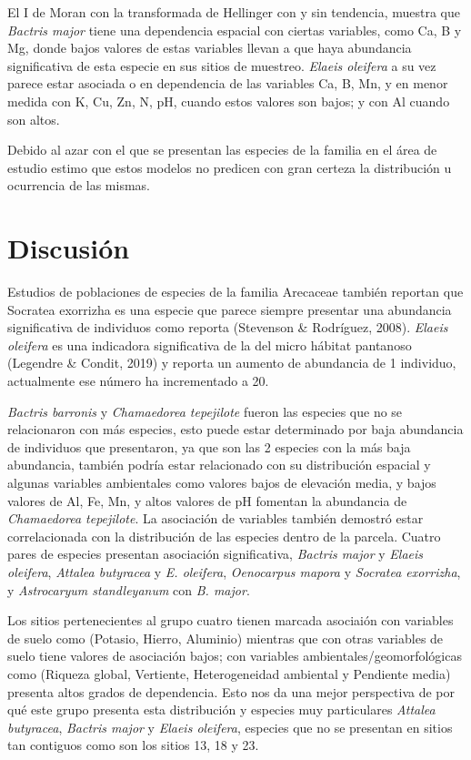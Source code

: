 \documentclass[11pt,]{article}
\begin{document}
El I de Moran con la transformada de Hellinger con y sin tendencia,
muestra que \emph{Bactris major} tiene una dependencia espacial con
ciertas variables, como Ca, B y Mg, donde bajos valores de estas
variables llevan a que haya abundancia significativa de esta especie en
sus sitios de muestreo. \emph{Elaeis oleifera} a su vez parece estar
asociada o en dependencia de las variables Ca, B, Mn, y en menor medida
con K, Cu, Zn, N, pH, cuando estos valores son bajos; y con Al cuando
son altos.

Debido al azar con el que se presentan las especies de la familia en el
área de estudio estimo que estos modelos no predicen con gran certeza la
distribución u ocurrencia de las mismas.

\section{Discusión}\label{discusiuxf3n}

Estudios de poblaciones de especies de la familia Arecaceae también
reportan que Socratea exorrizha es una especie que parece siempre
presentar una abundancia significativa de individuos como reporta
(Stevenson \& Rodríguez, 2008). \emph{Elaeis oleifera} es una indicadora
significativa de la del micro hábitat pantanoso (Legendre \& Condit,
2019) y reporta un aumento de abundancia de 1 individuo, actualmente ese
número ha incrementado a 20.

\emph{Bactris barronis} y \emph{Chamaedorea tepejilote} fueron las
especies que no se relacionaron con más especies, esto puede estar
determinado por baja abundancia de individuos que presentaron, ya que
son las 2 especies con la más baja abundancia, también podría estar
relacionado con su distribución espacial y algunas variables ambientales
como valores bajos de elevación media, y bajos valores de Al, Fe, Mn, y
altos valores de pH fomentan la abundancia de \emph{Chamaedorea
tepejilote}. La asociación de variables también demostró estar
correlacionada con la distribución de las especies dentro de la parcela.
Cuatro pares de especies presentan asociación significativa,
\emph{Bactris major} y \emph{Elaeis oleifera}, \emph{Attalea butyracea}
y \emph{E. oleifera}, \emph{Oenocarpus mapora} y \emph{Socratea
exorrizha}, y \emph{Astrocaryum standleyanum} con \emph{B. major}.

Los sitios pertenecientes al grupo cuatro tienen marcada asociaión con
variables de suelo como (Potasio, Hierro, Aluminio) mientras que con
otras variables de suelo tiene valores de asociación bajos; con
variables ambientales/geomorfológicas como (Riqueza global, Vertiente,
Heterogeneidad ambiental y Pendiente media) presenta altos grados de
dependencia. Esto nos da una mejor perspectiva de por qué este grupo
presenta esta distribución y especies muy particulares \emph{Attalea
butyracea}, \emph{Bactris major} y \emph{Elaeis oleifera}, especies que
no se presentan en sitios tan contiguos como son los sitios 13, 18 y 23.
\end{document}
